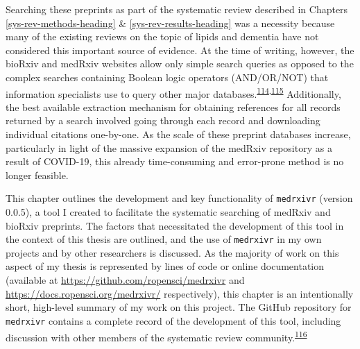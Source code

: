 \documentclass[a4paper, twoside]{templates/ociamthesis}
\begin{document}
Searching these preprints as part of the systematic review described in Chapters \ref{sys-rev-methods-heading} \& \ref{sys-rev-results-heading} was a necessity because many of the existing reviews on the topic of lipids and dementia have not considered this important source of evidence. At the time of writing, however, the bioRxiv and medRxiv websites allow only simple search queries as opposed to the complex searches containing Boolean logic operators (AND/OR/NOT) that information specialists use to query other major databases.\textsuperscript{\protect\hyperlink{ref-bramer2018}{114},\protect\hyperlink{ref-gusenbauer2020}{115}} Additionally, the best available extraction mechanism for obtaining references for all records returned by a search involved going through each record and downloading individual citations one-by-one. As the scale of these preprint databases increase, particularly in light of the massive expansion of the medRxiv repository as a result of COVID-19, this already time-consuming and error-prone method is no longer feasible.

This chapter outlines the development and key functionality of \texttt{medrxivr} (version 0.0.5), a tool I created to facilitate the systematic searching of medRxiv and bioRxiv preprints. The factors that necessitated the development of this tool in the context of this thesis are outlined, and the use of \texttt{medrxivr} in my own projects and by other researchers is discussed. As the majority of work on this aspect of my thesis is represented by lines of code or online documentation (available at \url{https://github.com/ropensci/medrxivr} and \url{https://docs.ropensci.org/medrxivr/} respectively), this chapter is an intentionally short, high-level summary of my work on this project. The GitHub repository for \texttt{medrxivr} contains a complete record of the development of this tool, including discussion with other members of the systematic review community.\textsuperscript{\protect\hyperlink{ref-zotero-15029}{116}}

~
\end{document}
